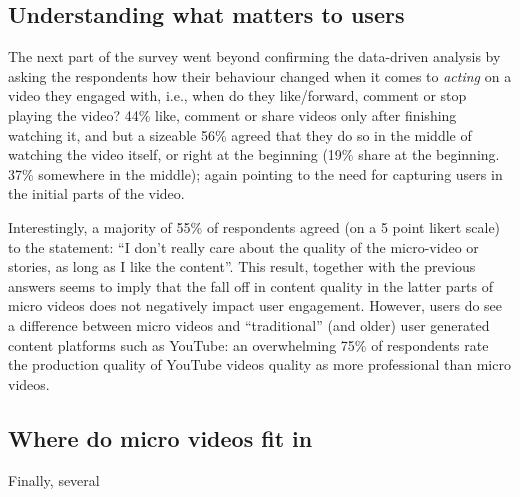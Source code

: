 \subsection{Understanding what matters to users}
The next part of the survey went beyond confirming the data-driven analysis by asking the respondents how their behaviour changed when it comes to \emph{acting} on a video they engaged with, i.e., when do they like/forward, comment or stop playing the video? 44\% like, comment or share videos only after finishing watching it, and but a sizeable 56\% agreed that they do so in the middle of watching the video itself, or right at the beginning (19\% share at the beginning. 37\% somewhere in the middle); again pointing to the need for capturing users in the initial parts of the video. 

Interestingly, a majority of 55\% of respondents agreed (on a 5 point likert scale) to the statement: ``I don't really care about the quality of the micro-video or stories, as long as I like the content''. This result, together with the previous answers seems to imply that   the fall off in content quality in the latter parts of micro videos does not negatively impact user engagement. However, users do see a difference between micro videos and ``traditional'' (and older) user generated content platforms such as YouTube: an overwhelming 75\% of respondents rate the production quality of YouTube videos quality as more professional than micro videos.

\subsection{Where do micro videos fit in}
Finally, several 
	